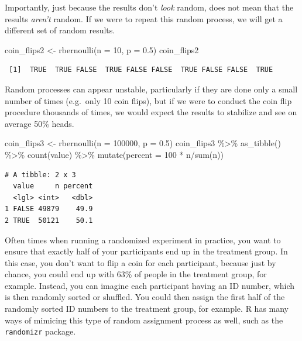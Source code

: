 \documentclass[
  letterpaper,
  DIV=11,
  numbers=noendperiod]{scrreprt}
\newenvironment{Shaded}{\begin{snugshade}}{\end{snugshade}}
\newcommand{\AttributeTok}[1]{\textcolor[rgb]{0.40,0.45,0.13}{#1}}
\newcommand{\DecValTok}[1]{\textcolor[rgb]{0.68,0.00,0.00}{#1}}
\newcommand{\FloatTok}[1]{\textcolor[rgb]{0.68,0.00,0.00}{#1}}
\newcommand{\FunctionTok}[1]{\textcolor[rgb]{0.28,0.35,0.67}{#1}}
\newcommand{\NormalTok}[1]{\textcolor[rgb]{0.00,0.23,0.31}{#1}}
\newcommand{\OtherTok}[1]{\textcolor[rgb]{0.00,0.23,0.31}{#1}}
\newcommand{\SpecialCharTok}[1]{\textcolor[rgb]{0.37,0.37,0.37}{#1}}
\theoremstyle{definition}
\theoremstyle{remark}
\begin{document}
Importantly, just because the results don't \emph{look} random, does not
mean that the results \emph{aren't} random. If we were to repeat this
random process, we will get a different set of random results.

\begin{Shaded}
\begin{Highlighting}[]
\NormalTok{coin\_flips2 }\OtherTok{\textless{}{-}} \FunctionTok{rbernoulli}\NormalTok{(}\AttributeTok{n =} \DecValTok{10}\NormalTok{, }\AttributeTok{p =} \FloatTok{0.5}\NormalTok{)}
\NormalTok{coin\_flips2}
\end{Highlighting}
\end{Shaded}

\begin{verbatim}
 [1]  TRUE  TRUE FALSE  TRUE FALSE FALSE  TRUE FALSE FALSE  TRUE
\end{verbatim}

Random processes can appear unstable, particularly if they are done only
a small number of times (e.g.~only 10 coin flips), but if we were to
conduct the coin flip procedure thousands of times, we would expect the
results to stabilize and see on average 50\% heads.

\begin{Shaded}
\begin{Highlighting}[]
\NormalTok{coin\_flips3 }\OtherTok{\textless{}{-}} \FunctionTok{rbernoulli}\NormalTok{(}\AttributeTok{n =} \DecValTok{100000}\NormalTok{, }\AttributeTok{p =} \FloatTok{0.5}\NormalTok{)}
\NormalTok{coin\_flips3 }\SpecialCharTok{\%\textgreater{}\%} 
  \FunctionTok{as\_tibble}\NormalTok{() }\SpecialCharTok{\%\textgreater{}\%} 
  \FunctionTok{count}\NormalTok{(value) }\SpecialCharTok{\%\textgreater{}\%} 
  \FunctionTok{mutate}\NormalTok{(}\AttributeTok{percent =} \DecValTok{100} \SpecialCharTok{*}\NormalTok{ n}\SpecialCharTok{/}\FunctionTok{sum}\NormalTok{(n))}
\end{Highlighting}
\end{Shaded}

\begin{verbatim}
# A tibble: 2 x 3
  value     n percent
  <lgl> <int>   <dbl>
1 FALSE 49879    49.9
2 TRUE  50121    50.1
\end{verbatim}

Often times when running a randomized experiment in practice, you want
to ensure that exactly half of your participants end up in the treatment
group. In this case, you don't want to flip a coin for each participant,
because just by chance, you could end up with 63\% of people in the
treatment group, for example. Instead, you can imagine each participant
having an ID number, which is then randomly sorted or shuffled. You
could then assign the first half of the randomly sorted ID numbers to
the treatment group, for example. R has many ways of mimicing this type
of random assignment process as well, such as the \texttt{randomizr}
package.
\end{document}
